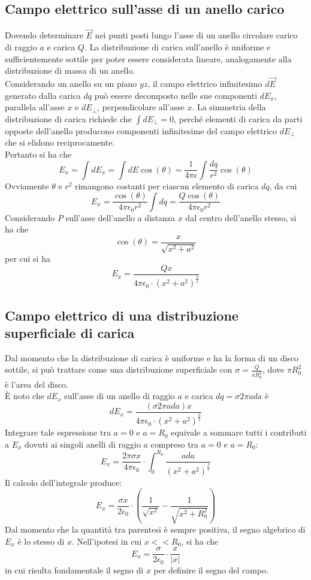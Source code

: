 \documentclass[a4paper]{extarticle}
\begin{document}
\subsection{Campo elettrico sull'asse di un anello carico}
Dovendo determinare $\vec E$ nei punti posti lungo l'asse di un anello circolare carico di raggio $a$ e carica $Q$. La distribuzione di carica sull'anello è uniforme e sufficientemente sottile per poter essere considerata lineare, analogamente alla distribuzione di massa di un anello.\\
Considerando un anello su un piano $yz$, il campo elettrico infinitesimo $d \vec E$ generato dalla carica $dq$ può essere decomposto nelle sue componenti $dE_x$, parallela all'asse $x$ e $dE_\perp$, perpendicolare all'asse $x$. La simmetria della distribuzione di carica richiede che $\int dE_\perp = 0$, perché elementi di carica da parti opposte dell'anello producono componenti infinitesime del campo elettrico $d E_\perp$ che si elidono reciprocamente.\\
Pertanto si ha che
\[E_x = \int d E_x = \int dE \cos(\theta) = \frac{1}{4 \pi \epsilon} \int \frac{dq}{r^2} \cos(\theta)\]
Ovviamente $\theta$ e $r^2$ rimangono costanti per ciascun elemento di carica $dq$, da cui
\[E_x = \frac{\cos(\theta)}{4 \pi \epsilon_0 r^2} \int dq = \frac{Q \cos(\theta)}{4 \pi \epsilon_0 r^2}\]
Considerando $P$ sull'asse dell'anello a distanza $x$ dal centro dell'anello stesso, si ha che
\[\cos(\theta) = \frac{x}{\sqrt{x^2 + a^2}}\]
per cui si ha
\[\boxed{E_x=\frac{Qx}{4 \pi \epsilon_0 \cdot \left(x^2+a^2\right)^{\frac{3}{2}}}}\]
 
\vspace{1em}
\noindent
\subsection{Campo elettrico di una distribuzione superficiale di carica}
Dal momento che la distribuzione di carica è uniforme e ha la forma di un disco sottile, si può trattare come una distribuzione superficiale con $\sigma = \frac{Q}{\pi R_0^2}$, dove $\pi R_0^2$ è l'area del disco.\\
È noto che $dE_x$ sull'asse di un anello di raggio $a$ e carica $dq = \sigma 2 \pi a da$ è
\[dE_x = \frac{\left(\sigma 2 \pi a da\right) x}{4 \pi \epsilon_0 \cdot \left(x^2 + a^2\right)^{\frac{3}{2}}}\]
Integrare tale espressione tra $a=0$ e $a=R_0$ equivale a sommare tutti i contributi a $E_x$ dovuti ai singoli anelli di raggio $a$ compreso tra $a=0$ e $a=R_0$:
\[E_x = \frac{2 \pi \sigma x}{4 \pi \epsilon_0} \cdot \int_0^{R_0} \frac{a da}{\left(x^2 + a^2\right)^{\frac{3}{2}}}\]
Il calcolo dell'integrale produce:
\[\boxed{E_x = \frac{\sigma x}{2 \epsilon_0} \cdot \left(\frac{1}{\sqrt{x^2}} - \frac{1}{\sqrt{x^2 + R_0^2}}\right)}\]
Dal momento che la quantità tra parentesi è sempre positiva, il segno algebrico di $E_x$ è lo stesso di $x$. Nell'ipotesi in cui $x << R_0$, si ha che
\[\boxed{E_x = \frac{\sigma}{2 \epsilon_0} \cdot \frac{x}{\vert x \vert}}\]
in cui risulta fondamentale il segno di $x$ per definire il segno del campo.
\end{document}

